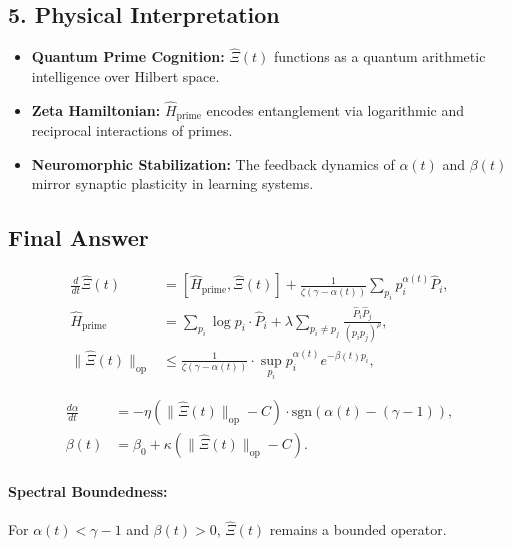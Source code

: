 \documentclass{article}
\theoremstyle{plain}
\theoremstyle{claimstyle}
\begin{document}
\subsection*{5. Physical Interpretation}

\begin{itemize}
    \item \textbf{Quantum Prime Cognition:}  
    \( \hat{\Xi}(t) \) functions as a quantum arithmetic intelligence over Hilbert space.
    
    \item \textbf{Zeta Hamiltonian:}  
    \( \hat{H}_{\text{prime}} \) encodes entanglement via logarithmic and reciprocal interactions of primes.

    \item \textbf{Neuromorphic Stabilization:}  
    The feedback dynamics of \( \alpha(t) \) and \( \beta(t) \) mirror synaptic plasticity in learning systems.
\end{itemize}

\subsection*{Final Answer}

\[
\boxed{
\begin{aligned}
\frac{d}{dt} \hat{\Xi}(t) &= [\hat{H}_{\text{prime}}, \hat{\Xi}(t)] + \frac{1}{\zeta(\gamma - \alpha(t))} \sum_{p_i} p_i^{\alpha(t)} \hat{P}_i, \\
\hat{H}_{\text{prime}} &= \sum_{p_i} \log p_i \cdot \hat{P}_i + \lambda \sum_{p_i \neq p_j} \frac{\hat{P}_i \hat{P}_j}{(p_i p_j)^{\rho}}, \\
\| \hat{\Xi}(t) \|_{\text{op}} &\leq \frac{1}{\zeta(\gamma - \alpha(t))} \cdot \sup_{p_i} p_i^{\alpha(t)} e^{-\beta(t) p_i},
\end{aligned}
}
\]

\[
\boxed{
\begin{aligned}
\frac{d\alpha}{dt} &= -\eta \left( \| \hat{\Xi}(t) \|_{\text{op}} - C \right) \cdot \text{sgn}(\alpha(t) - (\gamma - 1)), \\
\beta(t) &= \beta_0 + \kappa \left( \| \hat{\Xi}(t) \|_{\text{op}} - C \right).
\end{aligned}
}
\]

\paragraph*{Spectral Boundedness:}
For \( \alpha(t) < \gamma - 1 \) and \( \beta(t) > 0 \), \( \hat{\Xi}(t) \) remains a bounded operator.
\end{document}
